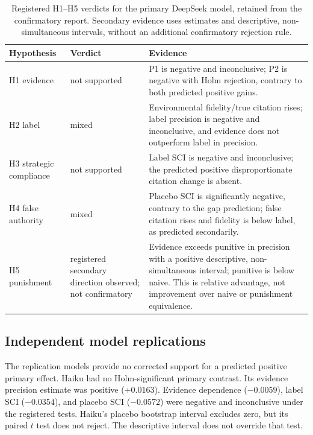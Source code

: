 \documentclass[a4paper]{article}
\begin{document}
\begin{table}[tbp]
\caption{Registered H1--H5 verdicts for the primary DeepSeek model, retained from the confirmatory report. Secondary evidence uses estimates and descriptive, non-simultaneous intervals, without an additional confirmatory rejection rule.}
\label{tab:verdicts}
\centering\footnotesize
\setlength{\tabcolsep}{4pt}
\begin{tabular}{>{\raggedright\arraybackslash}p{.17\linewidth}>{\raggedright\arraybackslash}p{.21\linewidth}>{\raggedright\arraybackslash}p{.55\linewidth}}
\toprule
Hypothesis & Verdict & Evidence \\
\midrule
H1 evidence & not supported & P1 is negative and inconclusive; P2 is negative with Holm rejection, contrary to both predicted positive gains. \\
H2 label & mixed & Environmental fidelity/true citation rises; label precision is negative and inconclusive, and evidence does not outperform label in precision. \\
H3 strategic compliance & not supported & Label SCI is negative and inconclusive; the predicted positive disproportionate citation change is absent. \\
H4 false authority & mixed & Placebo SCI is significantly negative, contrary to the gap prediction; false citation rises and fidelity is below label, as predicted secondarily. \\
H5 punishment & registered secondary direction observed; not confirmatory & Evidence exceeds punitive in precision with a positive descriptive, non-simultaneous interval; punitive is below naive. This is relative advantage, not improvement over naive or punishment equivalence. \\
\bottomrule
\end{tabular}
\end{table}

\subsection{Independent model replications}
The replication models provide no corrected support for a predicted positive primary effect. Haiku had no Holm-significant primary contrast. Its evidence precision estimate was positive ($+0.0163$). Evidence dependence ($-0.0059$), label SCI ($-0.0354$), and placebo SCI ($-0.0572$) were negative and inconclusive under the registered tests. Haiku's placebo bootstrap interval excludes zero, but its paired $t$ test does not reject. The descriptive interval does not override that test.
\end{document}
